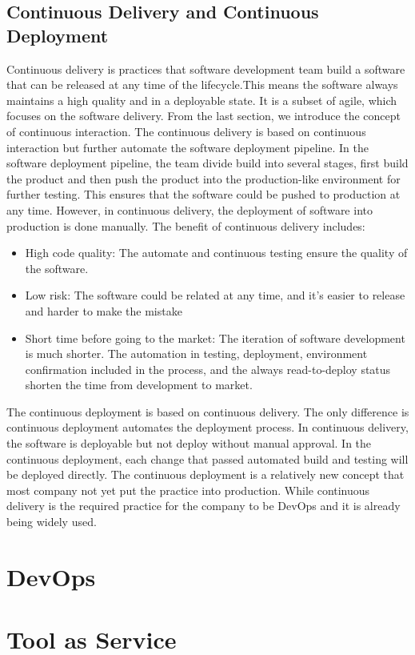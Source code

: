 \subsection{Continuous Delivery and Continuous Deployment}
Continuous delivery is practices that software development team build a software that can be released at any time of the lifecycle.\cite{fowler2013continuous}This means the software always maintains a high quality and in a deployable state.\cite{WhatisCo47:online} It is a subset of agile, which focuses on the software delivery.\cite{Continuo97:online} From the last section, we introduce the concept of continuous interaction. The continuous delivery is based on continuous interaction but further automate the software deployment pipeline. In the software deployment pipeline, the team divide build into several stages, first build the product and then push the product into the production-like environment for further testing. This ensures that the software could be pushed to production at any time. However, in continuous delivery, the deployment of software into production is done manually.
The benefit of continuous delivery includes:\cite{WhatisCo47:online}\cite{fowler2013continuous}
\begin{itemize}
    \item High code quality: The automate and continuous testing ensure the quality of the software.
    \item Low risk: The software could be related at any time, and it's easier to release and harder to make the mistake
    \item Short time before going to the market: The iteration of software development is much shorter. The automation in testing, deployment, environment confirmation included in the process, and the always read-to-deploy status shorten the time from development to market.
\end{itemize}
The continuous deployment is based on continuous delivery. The only difference is continuous deployment automates the deployment process. In continuous delivery, the software is deployable but not deploy without manual approval. In the continuous deployment, each change that passed automated build and testing will be deployed directly. The continuous deployment is a relatively new concept that most company not yet put the practice into production.\cite{leppanen2015highways} While continuous delivery is the required practice for the company to be DevOps and it is already being widely used.
\section{DevOps}

\section{Tool as Service}
